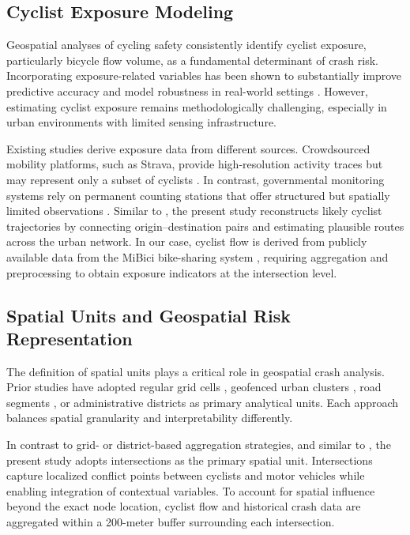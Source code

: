 \documentclass[preprint,12pt]{elsarticle}
\begin{document}
\subsection{Cyclist Exposure Modeling}

Geospatial analyses of cycling safety consistently identify cyclist exposure, particularly bicycle flow volume, as a fundamental determinant of crash risk. Incorporating exposure-related variables has been shown to substantially improve predictive accuracy and model robustness in real-world settings \cite{ferster_mapping_2021,kielhauser_identifying_2020}. However, estimating cyclist exposure remains methodologically challenging, especially in urban environments with limited sensing infrastructure.

Existing studies derive exposure data from different sources. Crowdsourced mobility platforms, such as Strava, provide high-resolution activity traces but may represent only a subset of cyclists \cite{ferster_mapping_2021,venter_bias_2023}. In contrast, governmental monitoring systems rely on permanent counting stations that offer structured but spatially limited observations \cite{kielhauser_identifying_2020}. Similar to \cite{xue_integrating_2024}, the present study reconstructs likely cyclist trajectories by connecting origin–destination pairs and estimating plausible routes across the urban network. In our case, cyclist flow is derived from publicly available data from the MiBici bike-sharing system \cite{noauthor_mibici_nodate}, requiring aggregation and preprocessing to obtain exposure indicators at the intersection level.

\subsection{Spatial Units and Geospatial Risk Representation}

The definition of spatial units plays a critical role in geospatial crash analysis. Prior studies have adopted regular grid cells \cite{jaber_towards_2023}, geofenced urban clusters \cite{prencipe_injury_2025}, road segments \cite{ferster_mapping_2021}, or administrative districts \cite{kielhauser_identifying_2020} as primary analytical units. Each approach balances spatial granularity and interpretability differently.

In contrast to grid- or district-based aggregation strategies, and similar to \cite{schroter_determinants_2023}, the present study adopts intersections as the primary spatial unit. Intersections capture localized conflict points between cyclists and motor vehicles while enabling integration of contextual variables. To account for spatial influence beyond the exact node location, cyclist flow and historical crash data are aggregated within a 200-meter buffer surrounding each intersection.
\end{document}
